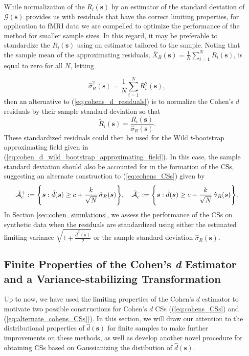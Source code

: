 While normalization of the $R_{i}(\bm{s})$ by an estimator of the standard deviation of $\mathcal{G}(\bm{s})$ provides us with residuals that have the correct limiting properties, for application to fMRI data we are compelled to optimize the performance of the method for smaller sample sizes. In this regard, it may be preferable to standardize the $R_i(\bm{s})$ using an estimator tailored to the sample. Noting that the sample mean of the approximating residuals, $\bar{X}_{R}(\bm{s}) = \frac{1}{N} \sum_{i=1}^{N} R_{i}(\bm{s})$, is equal to zero for all $N$, letting  

\begin{equation}
\label{eq:sd_of_approximate_residuals}
\hat{\sigma}_{R}^{2}(\bm{s}) = \frac{1}{N} \sum_{i=1}^{N} R_{i}^{2}(\bm{s}),
\end{equation}
then an alternative to (\ref{eq:cohens_d_residuals}) is to normalize the Cohen's $d$ residuals by their sample standard deviation so that
\begin{equation}
\label{eq:alternate_cohens_d_residuals}
\tilde{R}_{i}(\bm{s}) = \frac{R_{i}(\bm{s})}{\hat{\sigma}_{R}(\bm{s})}.
\end{equation}
These standardized residuals could then be used for the Wild $t$-bootstrap approximating field given in (\ref{eq:cohen_d_wild_bootstrap_approximating_field}). In this case, the sample standard deviation should also be accounted for in the formation of the CSs, suggesting an alternate construction to (\ref{eq:cohens_CSs}) given by
\begin{equation}
\label{eq:alternate_cohens_CSs}
\operatorname{\hat{\mathcal{A}}_{c}^+} := \Bigg\{\bm{s} : \hat{d}(\bm{s}) \geq c + \frac{k}{\sqrt{N}}\, \hat{\sigma}_{R}(\bm{s}) \Bigg\}, \quad \operatorname{\hat{\mathcal{A}}_{c}^{\textrm{--}}} := \Bigg\{\bm{s} : \hat{d}(\bm{s}) \geq c - \frac{k}{\sqrt{N}} \,\hat{\sigma}_{R}(\bm{s}) \Bigg\}.
\end{equation}
In Section \ref{sec:cohen_simulations}, we assess the performance of the CSs on synthetic data when the residuals are standardized using either the estimated limiting variance $\sqrt{1 + \frac{\hat{d}^{2}(\bm{s})}{2}}$ or the sample standard deviation $\hat{\sigma}_{R}(\bm{s})$.

\subsection{Finite Properties of the Cohen's \textit{d} Estimator and a Variance-stabilizing Transformation}
\label{sec:normalizing_cohens_d}
Up to now, we have used the limiting properties of the Cohen's $d$ estimator to motivate two possible constructions for Cohen's $d$ CSs ((\ref{eq:cohens_CSs}) and (\ref{eq:alternate_cohens_CSs})). In this section, we will draw our attention to the distributional properties of $\hat{d}(\bm{s})$ for finite samples to make further improvements on these methods, as well as develop another novel procedure for obtaining CSs based on Gaussianizing the distibution of $\hat{d}(\bm{s})$. 

